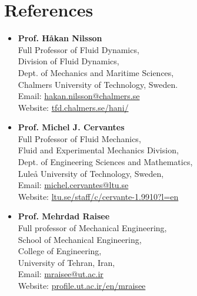 \section*{References}{}

\begin{itemize}
    \item \textbf{Prof. H\aa kan Nilsson}\\
    Full Professor of Fluid Dynamics,\\
    Division of Fluid Dynamics,\\
    Dept. of Mechanics and Maritime Sciences,\\
    Chalmers University of Technology, Sweden.\\
    Email: \href{mailto:hakan.nilsson@chalmers.se}{hakan.nilsson@chalmers.se}\\
    Website: \href{http://www.tfd.chalmers.se/~hani/}{tfd.chalmers.se/{\texttildelow}hani/}

    \item \textbf{Prof. Michel J. Cervantes}\\
    Full Professor of Fluid Mechanics,\\
    Fluid and Experimental Mechanics Division,\\
    Dept. of Engineering Sciences and Mathematics,\\
    Lule\r{a} University of Technology, Sweden,\\
    Email: \href{mailto:michel.cervantes@ltu.se}{michel.cervantes@ltu.se}\\	
    Website: \href{https://www.ltu.se/staff/c/cervante-1.9910?l=enb}{ltu.se/staff/c/cervante-1.9910?l=en}
    
    \item \textbf{Prof. Mehrdad Raisee}\\
    Full professor of Mechanical Engineering,\\
    School of Mechanical Engineering,\\
    College of Engineering,\\
    University of Tehran, Iran,\\
    Email: \href{mailto:mraisee@ut.ac.ir}{mraisee@ut.ac.ir}\\
    Website: \href{https://profile.ut.ac.ir/en/~mraisee}{profile.ut.ac.ir/en/{\texttildelow}mraisee}


\end{itemize}
